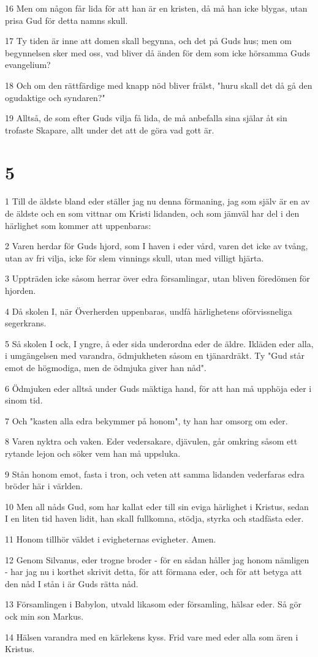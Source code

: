 \par 16 Men om någon får lida för att han är en kristen, då må han icke blygas, utan prisa Gud för detta namns skull.
\par 17 Ty tiden är inne att domen skall begynna, och det på Guds hus; men om begynnelsen sker med oss, vad bliver då änden för dem som icke hörsamma Guds evangelium?
\par 18 Och om den rättfärdige med knapp nöd bliver frälst, "huru skall det då gå den ogudaktige och syndaren?"
\par 19 Alltså, de som efter Guds vilja få lida, de må anbefalla sina själar åt sin trofaste Skapare, allt under det att de göra vad gott är.

\chapter{5}

\par 1 Till de äldste bland eder ställer jag nu denna förmaning, jag som själv är en av de äldste och en som vittnar om Kristi lidanden, och som jämväl har del i den härlighet som kommer att uppenbaras:
\par 2 Varen herdar för Guds hjord, som I haven i eder vård, varen det icke av tvång, utan av fri vilja, icke för slem vinnings skull, utan med villigt hjärta.
\par 3 Uppträden icke såsom herrar över edra församlingar, utan bliven föredömen för hjorden.
\par 4 Då skolen I, när Överherden uppenbaras, undfå härlighetens oförvissneliga segerkrans.
\par 5 Så skolen I ock, I yngre, å eder sida underordna eder de äldre. Ikläden eder alla, i umgängelsen med varandra, ödmjukheten såsom en tjänardräkt. Ty "Gud står emot de högmodiga, men de ödmjuka giver han nåd".
\par 6 Ödmjuken eder alltså under Guds mäktiga hand, för att han må upphöja eder i sinom tid.
\par 7 Och "kasten alla edra bekymmer på honom", ty han har omsorg om eder.
\par 8 Varen nyktra och vaken. Eder vedersakare, djävulen, går omkring såsom ett rytande lejon och söker vem han må uppsluka.
\par 9 Stån honom emot, fasta i tron, och veten att samma lidanden vederfaras edra bröder här i världen.
\par 10 Men all nåds Gud, som har kallat eder till sin eviga härlighet i Kristus, sedan I en liten tid haven lidit, han skall fullkomna, stödja, styrka och stadfästa eder.
\par 11 Honom tillhör väldet i evigheternas evigheter. Amen.
\par 12 Genom Silvanus, eder trogne broder - för en sådan håller jag honom nämligen - har jag nu i korthet skrivit detta, för att förmana eder, och för att betyga att den nåd I stån i är Guds rätta nåd.
\par 13 Församlingen i Babylon, utvald likasom eder församling, hälsar eder. Så gör ock min son Markus.
\par 14 Hälsen varandra med en kärlekens kyss. Frid vare med eder alla som ären i Kristus.


